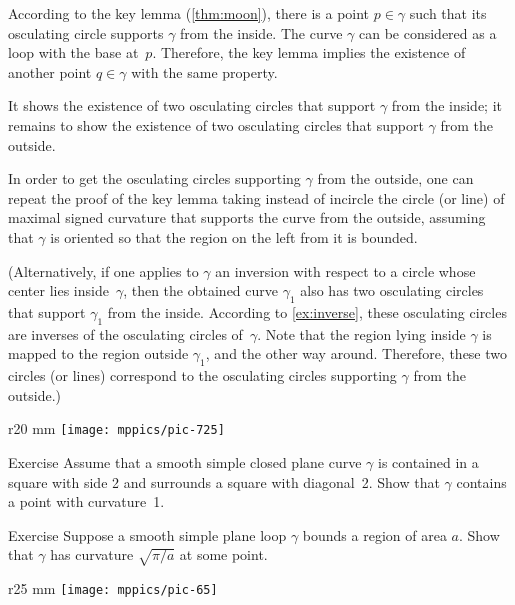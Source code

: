According to the key lemma (\ref{thm:moon}), there is a point $p\in\gamma$ such that its osculating circle supports $\gamma$ from the inside.
The curve $\gamma$ can be considered as a loop with the base at~$p$.
Therefore, the key lemma implies the existence of another point $q\in\gamma$ with the same property.

It shows the existence of two osculating circles that support $\gamma$ from the inside;
it remains to show the existence of two osculating circles that support $\gamma$ from the outside.

In order to get the osculating circles supporting $\gamma$ from the outside, one can repeat the proof of the key lemma taking instead of incircle the circle (or line) of maximal signed curvature that supports the curve from the outside, assuming that $\gamma$ is oriented so that the region on the left from it is bounded.

(Alternatively, if one applies to $\gamma$ an inversion with respect to a circle whose center lies inside~$\gamma$, then the obtained curve $\gamma_1$ also has  two osculating circles that support $\gamma_1$ from the inside.
According to \ref{ex:inverse}, these osculating circles are inverses of the osculating circles of~$\gamma$.
Note that the region lying inside $\gamma$ is mapped to the region outside $\gamma_1$, and the other way around.
Therefore, these two circles (or lines) correspond to the osculating circles supporting $\gamma$ from the outside.)
\qeds

{

\begin{wrapfigure}{r}{20 mm}
\vskip-6mm
\centering
\texttt{[image: mppics/pic-725]}
\vskip0mm
\end{wrapfigure}

\begin{thm}{Exercise}\label{ex:2-squares}
Assume that a smooth simple closed plane curve \(\gamma\) is contained in a square with side 2 and surrounds a square with diagonal~2.
Show that \(\gamma\) contains a point with curvature~1.
\end{thm}

}

\begin{thm}{Exercise}\label{ex:moon-area}
Suppose a smooth simple plane loop $\gamma$ bounds a region of area $a$.
Show that $\gamma$ has curvature $\sqrt{\pi/a}$ at some point.
\end{thm}

\begin{wrapfigure}[5]{r}{25 mm}
\vskip-7mm
\centering
\texttt{[image: mppics/pic-65]}
\vskip0mm
\end{wrapfigure}

